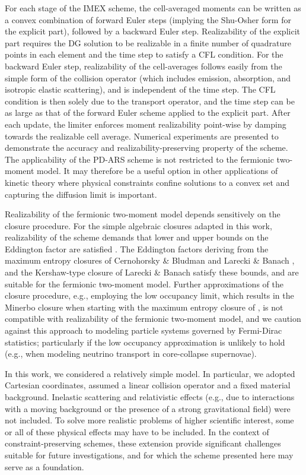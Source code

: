 For each stage of the IMEX scheme, the cell-averaged moments can be written as a convex combination of forward Euler steps (implying the Shu-Osher form for the explicit part), followed by a backward Euler step.  
Realizability of the explicit part requires the DG solution to be realizable in a finite number of quadrature points in each element and the time step to satisfy a CFL condition.  
For the backward Euler step, realizability of the cell-averages follows easily from the simple form of the collision operator (which includes emission, absorption, and isotropic elastic scattering), and is independent of the time step.  
The CFL condition is then solely due to the transport operator, and the time step can be as large as that of the forward Euler scheme applied to the explicit part.  
After each update, the limiter enforces moment realizability point-wise by damping towards the realizable cell average.  
Numerical experiments are presented to demonstrate the accuracy and realizability-preserving property of the scheme.  
The applicability of the PD-ARS scheme is not restricted to the fermionic two-moment model.  
It may therefore be a useful option in other applications of kinetic theory where physical constraints confine solutions to a convex set and capturing the diffusion limit is important.  

Realizability of the fermionic two-moment model depends sensitively on the closure procedure.  
For the simple algebraic closures adapted in this work, realizability of the scheme demands that lower and upper bounds on the Eddington factor are satisfied \cite{levermore_1984,lareckiBanach_2011}.  
The Eddington factors deriving from the maximum entropy closures of Cernohorsky \& Bludman \cite{cernohorskyBludman_1994} and Larecki \& Banach \cite{lareckiBanach_2011}, and the Kershaw-type closure of Larecki \& Banach \cite{banachLarecki_2017a} satisfy these bounds, and are suitable for the fermionic two-moment model.  
Further approximations of the closure procedure, e.g., employing the low occupancy limit, which results in the Minerbo closure \cite{minerbo_1978} when starting with the maximum entropy closure of \cite{cernohorskyBludman_1994}, is not compatible with realizability of the fermionic two-moment model, and we caution against this approach to modeling particle systems governed by Fermi-Dirac statistics; particularly if the low occupancy approximation is unlikely to hold (e.g., when modeling neutrino transport in core-collapse supernovae).  

In this work, we considered a relatively simple model.  
In particular, we adopted Cartesian coordinates, assumed a linear collision operator and a fixed material background.  
Inelastic scattering and relativistic effects (e.g., due to interactions with a moving background or the presence of a strong gravitational field) were not included.  
To solve more realistic problems of higher scientific interest, some or all of these physical effects may have to be included.  
In the context of constraint-preserving schemes, these extension provide significant challenges suitable for future investigations, and for which the scheme presented here may serve as a foundation.  